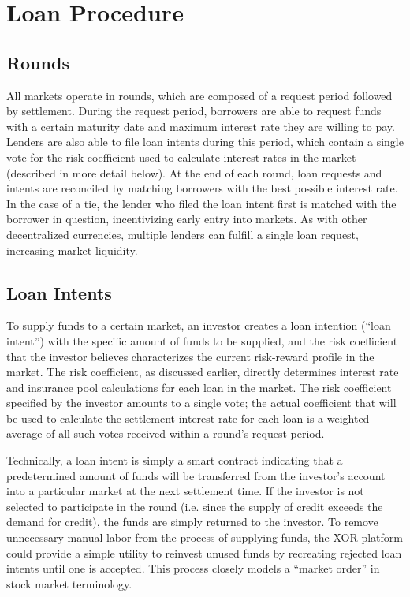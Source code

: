 \documentclass[twoside]{article}
\begin{document}
\section{Loan Procedure}
\subsection{Rounds}
All markets operate in rounds, which are composed of a request period followed by settlement. During the request period, borrowers are able to request funds with a certain maturity date and maximum interest rate they are willing to pay. Lenders are also able to file loan intents during this period, which contain a single vote for the risk coefficient used to calculate interest rates in the market (described in more detail below). At the end of each round, loan requests and intents are reconciled by matching borrowers with the best possible interest rate. In the case of a tie, the lender who filed the loan intent first is matched with the borrower in question, incentivizing early entry into markets. As with other decentralized currencies, multiple lenders can fulfill a single loan request, increasing market liquidity.

\subsection{Loan Intents}
To supply funds to a certain market, an investor creates a loan intention (“loan intent”) with the specific amount of funds to be supplied, and the risk coefficient that the investor believes characterizes the current risk-reward profile in the market. The risk coefficient, as discussed earlier, directly determines interest rate and insurance pool calculations for each loan in the market. The risk coefficient specified by the investor amounts to a single vote; the actual coefficient that will be used to calculate the settlement interest rate for each loan is a weighted average of all such votes received within a round’s request period.

Technically, a loan intent is simply a smart contract indicating that a predetermined amount of funds will be transferred from the investor’s account into a particular market at the next settlement time. If the investor is not selected to participate in the round (i.e. since the supply of credit exceeds the demand for credit), the funds are simply returned to the investor. To remove unnecessary manual labor from the process of supplying funds, the XOR platform could provide a simple utility to reinvest unused funds by recreating rejected loan intents until one is accepted. This process closely models a “market order” in stock market terminology.
\end{document}
